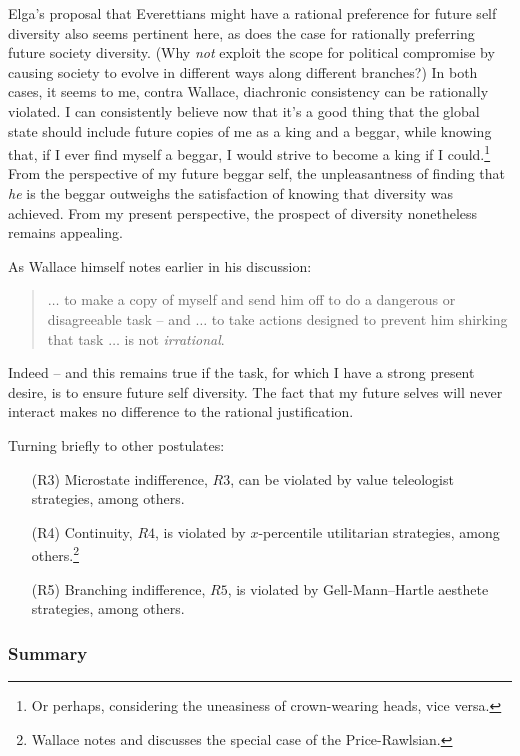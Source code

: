 \documentclass[aps,
pra,epsfig]{revtex4}
\begin{document}
Elga's proposal that Everettians might have a rational preference for 
future self diversity\cite{wallacevoltwoelga} also seems pertinent
here, as does the case for rationally preferring future 
society diversity.  (Why {\it not} 
exploit the scope for political compromise by causing   
society to evolve in different ways along different branches?) 
In both cases, it seems to me, 
contra Wallace\cite{wallacevoltwoelga}, diachronic 
consistency can be rationally violated.  
I can consistently believe now that it's a good thing that the 
global state should include future copies of me as a king and a beggar, 
while knowing that, if I ever find myself a beggar, I would strive to become
a king if I could.\footnote{Or perhaps, considering the uneasiness of 
crown-wearing heads, vice versa.}  From the perspective
of my future beggar self, the unpleasantness
of finding that {\it he} is the beggar outweighs the satisfaction of knowing
that diversity was achieved.   From my present perspective, the 
prospect of diversity nonetheless remains appealing. 

As Wallace himself notes earlier in his discussion\cite{wallacetwodictates}: 
\begin{quotation}
$\ldots$ to make a copy of myself and send him off to do a dangerous or 
disagreeable task -- and $\ldots$ to take actions designed to
prevent him shirking that task $\ldots$ is not {\it irrational}.
\end{quotation}
Indeed -- and this remains true if the task, for which I have a strong present
desire, is to ensure future self diversity.  The fact that my future 
selves will never interact makes no difference to the rational justification. 

Turning briefly to other postulates:
\begin{itemize}
\item[(R3)] Microstate indifference, $R3$, can be violated by value
teleologist strategies, among others.   
\item[(R4)] Continuity, $R4$, is 
violated by $x$-percentile utilitarian strategies,
among others.\footnote{Wallace\cite{wallacevoltwo} notes and discusses 
the special case of the Price-Rawlsian.}
\item[(R5)] Branching indifference, $R5$,
is violated by Gell-Mann--Hartle aesthete strategies, among others.  
\end{itemize}

\subsubsection{Summary}
\end{document}
